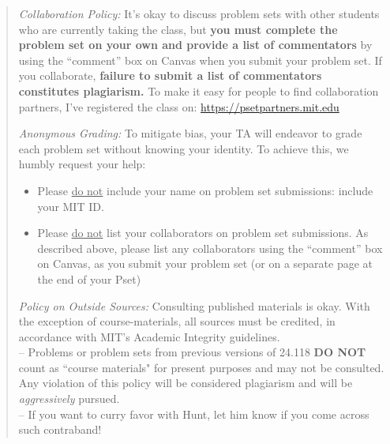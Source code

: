 \documentclass[11pt, a4paper]{article}
\begin{document}
\begin{quote}

    

\emph{Collaboration Policy:} It's okay to discuss problem sets with other students who are currently taking the class, but \textbf{you must complete the problem set on your own and provide a list of commentators} by using the ``comment'' box on Canvas when you submit your problem set. If you collaborate, \textbf{failure to submit a list of commentators constitutes plagiarism.}
To make it easy for people to find collaboration partners, I've registered the class on: \url{https://psetpartners.mit.edu}
\iffalse
\begin{center}
\url{https://psetpartners.mit.edu}
\end{center}
\fi 
\vspace{1mm}

\emph{Anonymous Grading:} To mitigate bias, your TA will endeavor to grade each problem set without knowing your identity. To achieve this, we humbly request your help:

\begin{itemize}
    \item Please \underline{do not} include your name on problem set submissions: {include your MIT ID}. 
    
    \item Please \underline{do not} list your collaborators on  problem set submissions. As described above, please list any collaborators using the ``comment'' box on Canvas, as you submit your problem set (or on a separate page at the end of your Pset)
\end{itemize}

\vspace{1mm}

\emph{Policy on Outside Sources:} Consulting published materials is okay. With the exception of course-materials, all sources must be credited, in accordance with MIT's Academic Integrity guidelines. \\
-- Problems or problem sets from previous versions of 24.118 \textbf{DO NOT} count as ``course materials" for present purposes and may not be consulted. Any violation of this policy will be considered plagiarism and will be \textit{aggressively} pursued. \\ -- If you want to curry favor with Hunt, let him know if you come across such contraband! 

\end{quote}
\end{document}
